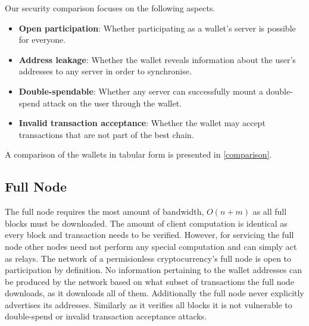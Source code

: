 \documentclass[sigconf]{acmart}
\begin{document}
Our security comparison focuses on the following aspects.
\begin{itemize}
    \item \textbf{Open participation}: Whether participating as a wallet's server is possible for everyone.
    \item \textbf{Address leakage}: Whether the wallet reveals information about the user's addresses to any server in order to synchronise.
    \item \textbf{Double-spendable}: Whether any server can successfully mount a double-spend attack on the user through the wallet.
    \item \textbf{Invalid transaction acceptance}: Whether the wallet may accept transactions that are not part of the best chain.
\end{itemize}

A comparison of the wallets in tabular form is presented in \cref{comparison}.

\subsection{Full Node}
The full node requires the most amount of bandwidth, $O(n+m)$ as all full blocks must be downloaded. The amount of client computation is identical as every block and transaction needs to be verified. However, for servicing the full node other nodes need not perform any special computation and can simply act as relays. The network of a permisionless cryptocurrency's full node is open to participation by definition. No information pertaining to the wallet addresses can be produced by the network based on what subset of transactions the full node downloads, as it downloads all of them. Additionally the full node never explicitly advertises its addresses. Similarly as it verifies all blocks it is not vulnerable to double-spend or invalid transaction acceptance attacks.
\end{document}
